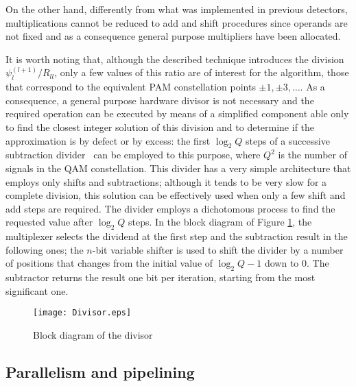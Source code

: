 \documentclass[12pt,onecolumn,draftclsnofoot]{IEEEtran}
\begin{document}
On the other hand, differently from what was implemented in previous
detectors, multiplications cannot be reduced to add and shift
procedures since operands are not fixed and as a consequence general
purpose multipliers have been allocated.


It is worth noting that, although the described technique introduces
the division $\psi_l^{(l+1)} / R_{ll}$, only a few values of this ratio
are of interest for the algorithm, those that correspond to the equivalent PAM
constellation points $\pm 1, \pm 3, \ldots$. As a consequence, a
general purpose hardware divisor is not necessary and the required
operation can be executed by means of a simplified component able only to
find the closest integer solution of this division and to determine
if the approximation is by defect or by excess: the first $\log_2 Q$
steps of a successive subtraction divider~\cite{ArithBook} can be
employed to this purpose, where $Q^2$ is the number of signals in
the QAM constellation. This divider has a very simple architecture
that employs only shifts and subtractions; although it tends to be
very slow for a complete division, this solution can be effectively
used when only a few shift and add steps are required. The divider employs a
dichotomous process to find the requested value after $\log_2 Q$
steps. In the block diagram of Figure \ref{Divisor}, the multiplexer
selects the dividend at the first step and the subtraction result 
in the following ones; the $n$-bit variable shifter is
used to shift the divider by a number of positions that changes from
the initial value of $\log_2 Q - 1$ down to 0. The subtractor
returns the result one bit per iteration, starting from
the most significant one.
\begin{figure}[t!]
    \begin{center}
    \texttt{[image: Divisor.eps]} \caption{Block diagram of the divisor}
    \label{Divisor}
    \end{center}
\end{figure}


\subsection{Parallelism and pipelining}
\end{document}

